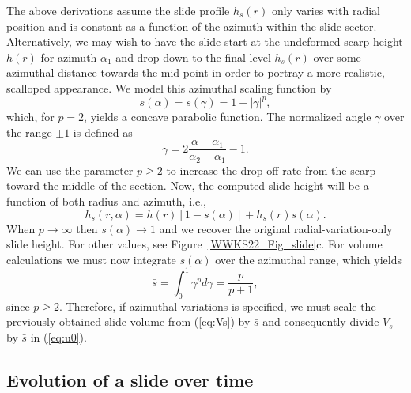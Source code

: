 The above derivations assume the slide profile $h_s(r)$ only varies with radial position and is constant as a function
of the azimuth within the slide sector. Alternatively, we may wish to have the slide start at the undeformed scarp height
$h(r)$ for azimuth $\alpha_1$ and drop down to the final level $h_s(r)$ over some azimuthal distance towards the mid-point in order
to portray a more realistic, scalloped appearance. We model this azimuthal scaling function by
\begin{equation*}
s(\alpha) = s(\gamma) = 1 - \left |\gamma\right|^p,
\end{equation*}
which, for $p = 2$, yields a concave parabolic function. The normalized angle $\gamma$ over the range $\pm1$ is defined as
\begin{equation*}
\gamma = 2\frac{\alpha - \alpha_1}{\alpha_2 - \alpha_1} - 1.
\end{equation*}
We can use the parameter $p \ge 2$ to increase the drop-off rate from the scarp toward the middle of the section.
Now, the computed slide height will be a function of both radius and azimuth, i.e.,
\begin{equation*}
h_s(r, \alpha) = h(r) \left [1 - s(\alpha)\right ] + h_s(r) s(\alpha).
\end{equation*}
When $p \rightarrow \infty$ then $s(\alpha) \rightarrow 1$ and we recover the original radial-variation-only slide height.
For other values, see Figure~\ref{WWKS22_Fig_slide}c. For volume calculations we must now integrate $s(\alpha)$ over the azimuthal range,
which yields
\begin{equation*}
\bar{s} = \int_0^1  \gamma^p d\gamma = \frac{p}{p+1},
\end{equation*}
since $p \ge 2$. Therefore, if azimuthal variations is specified, we must scale the previously obtained slide volume from
(\ref{eq:Vs}) by $\bar{s}$ and consequently divide $V_s$ by $\bar{s}$ in (\ref{eq:u0}).

\subsection{Evolution of a slide over time}

